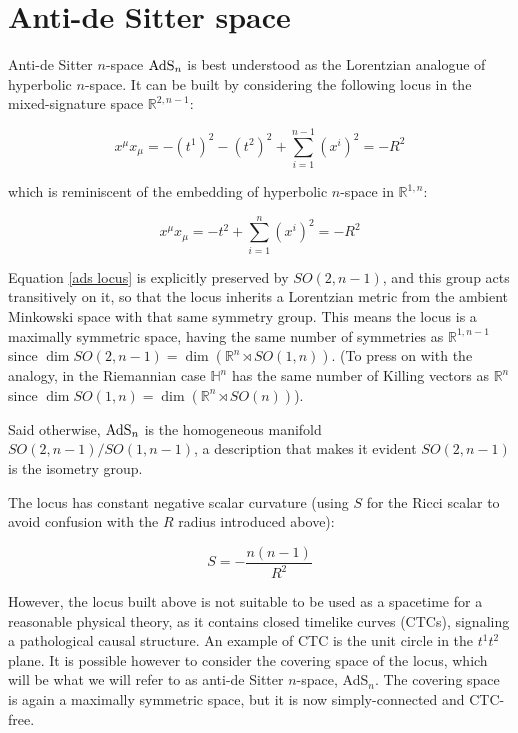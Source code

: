 
\section{Anti-de Sitter space}\label{app:ads}

Anti-de Sitter $n$-space $\operatorname{AdS}_{n}$ is best understood as the Lorentzian analogue of hyperbolic $n$-space. It can be built by considering the following locus in the mixed-signature space $\mathbb{R}^{2,n-1}$:

\begin{equation} \label{ads locus}
x^\mu x_\mu = -(t^1)^2 - (t^2)^2 + \sum_{i=1}^{n-1} (x^i)^2  =  - R^2
\end{equation}

which is reminiscent of the embedding of hyperbolic $n$-space in $\mathbb{R}^{1,n}$:

\begin{equation}
x^\mu x_\mu = -t^2 + \sum_{i=1}^{n} (x^i)^2 = - R^2
\end{equation}

Equation \ref{ads locus} is explicitly preserved by $SO(2,n-1)$, and this group acts transitively on it, so that the locus inherits a Lorentzian metric from the ambient Minkowski space with that same symmetry group. This means the locus is a maximally symmetric space, having the same number of symmetries as $\mathbb{R}^{1,n-1}$ since $\dim SO(2,n-1) = \dim \left( \mathbb{R}^n \rtimes SO(1,n) \right)$. (To press on with the analogy, in the Riemannian case $\mathbb{H}^n$ has the same number of Killing vectors as $\mathbb{R}^n$ since $\dim SO(1,n) = \dim \left(\mathbb{R}^n \rtimes SO(n) \right)$).

Said otherwise, $\operatorname{AdS}_{n}$ is the homogeneous manifold $SO(2,n-1)/SO(1,n-1)$, a description that makes it evident $SO(2,n-1)$ is the isometry group.

The locus has constant negative scalar curvature (using $S$ for the Ricci scalar to avoid confusion with the $R$ radius introduced above):

\begin{equation}
S = - \frac{n(n-1)}{R^2} 
\end{equation}

However, the locus built above is not suitable to be used as a spacetime for a reasonable physical theory, as it contains closed timelike curves (CTCs), signaling a pathological causal structure. An example of CTC is the unit circle in the $t^1 t^2$ plane. It is possible however to consider the covering space of the locus, which will be what we will refer to as anti-de Sitter $n$-space, AdS$_n$. The covering space is again a maximally symmetric space, but it is now simply-connected and CTC-free.

